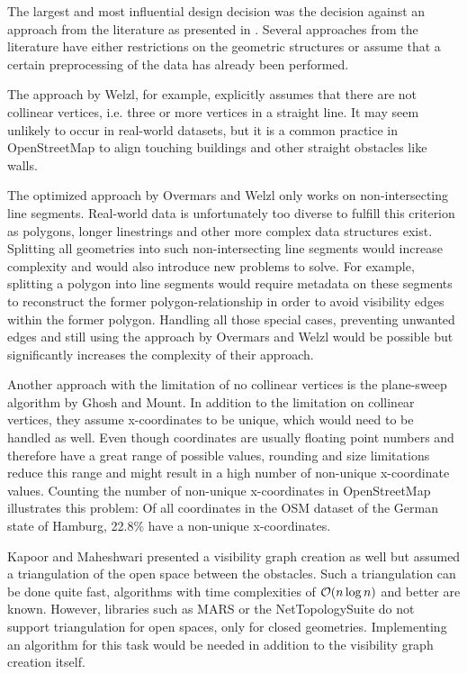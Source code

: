 		The largest and most influential design decision was the decision against an approach from the literature as presented in .
		Several approaches from the literature have either restrictions on the geometric structures or assume that a certain preprocessing of the data has already been performed.
		
		The approach by Welzl\cite{welzl-visibility-graph}, for example, explicitly assumes that there are not collinear vertices, i.e. three or more vertices in a straight line.
		It may seem unlikely to occur in real-world datasets, but it is a common practice in OpenStreetMap to align touching buildings and other straight obstacles like walls.
		
		The optimized approach by Overmars and Welzl\cite{overmars-weizl-visibility-graph} only works on non-intersecting line segments.
		Real-world data is unfortunately too diverse to fulfill this criterion as polygons, longer linestrings and other more complex data structures exist.
		Splitting all geometries into such non-intersecting line segments would increase complexity and would also introduce new problems to solve.
		For example, splitting a polygon into line segments would require metadata on these segments to reconstruct the former polygon-relationship in order to avoid visibility edges within the former polygon.
		Handling all those special cases, preventing unwanted edges and still using the approach by Overmars and Welzl would be possible but significantly increases the complexity of their approach.
		
		Another approach with the limitation of no collinear vertices is the plane-sweep algorithm by Ghosh and Mount\cite{ghosh-output-sensitive-vgraph}.
		In addition to the limitation on collinear vertices, they assume x-coordinates to be unique, which would need to be handled as well.
		Even though coordinates are usually floating point numbers and therefore have a great range of possible values, rounding and size limitations reduce this range and might result in a high number of non-unique x-coordinate values.
		Counting the number of non-unique x-coordinates in OpenStreetMap illustrates this problem:
		Of all coordinates in the OSM dataset of the German state of Hamburg, 22.8\% have a non-unique x-coordinates.
		
		Kapoor and Maheshwari presented a visibility graph creation as well\cite{kapoor-shortest-path-vgraph} but assumed a triangulation of the open space between the obstacles.
		Such a triangulation can be done quite fast, algorithms with time complexities of $\mathcal{O}(n \log{n})$ and better are known\cite[58-60]{de-berg-computational-geometry}.
		However, libraries such as MARS or the NetTopologySuite do not support triangulation for open spaces, only for closed geometries.
		Implementing an algorithm for this task would be needed in addition to the visibility graph creation itself.
		
